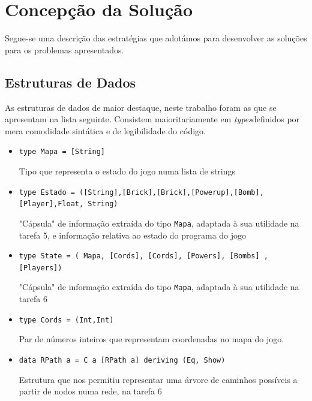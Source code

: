 \documentclass[a4paper]{article}
\begin{document}
\pagebreak













\section{Concepção da Solução}

    \hspace{0.54cm}Segue-se uma descrição das estratégias que adotámos para desenvolver as soluções 
    para os problemas apresentados.

\subsection{Estruturas de Dados}

    \hspace{0.54cm}As estruturas de dados de maior destaque, neste trabalho foram as que se apresentam 
    na lista seguinte. Consistem maioritariamente em \textit{types}definidos por mera comodidade sintática e de legibilidade do código. \hspace{12 cm}


    \begin{itemize}
    \item  \texttt{type Mapa   = [String]}
              \linebreak
              \raggedright{Tipo que representa o estado do jogo numa lista de strings}
              \linebreak
    \item  \texttt{type Estado = ([String],[Brick],[Brick],[Powerup],[Bomb],[Player],Float, String)}
              \linebreak 
              \raggedright{"Cápsula" de informação extraída do tipo \texttt{Mapa}, adaptada à sua
                          utilidade na tarefa 5, e informação relativa ao estado do programa do jogo}
              \linebreak
    \item  \texttt{type State  = ( Mapa, [Cords], [Cords], [Powers], [Bombs] , [Players])}
              \linebreak
              \raggedright{"Cápsula" de informação extraída do tipo \texttt{Mapa}, adaptada
                           à sua utilidade na tarefa 6}
              \linebreak
    \item  \texttt{type Cords  = (Int,Int)}
              \linebreak 
              \raggedright{Par de números inteiros que representam coordenadas no mapa do jogo.}
              \linebreak
    \item  \texttt{data RPath a = C a [RPath a] deriving (Eq, Show)}
              \linebreak 
              \raggedright{Estrutura que nos permitiu representar uma árvore de caminhos possíveis a 
                           partir de nodos numa rede, na tarefa 6}
    \end{itemize}
    
\end{document}
